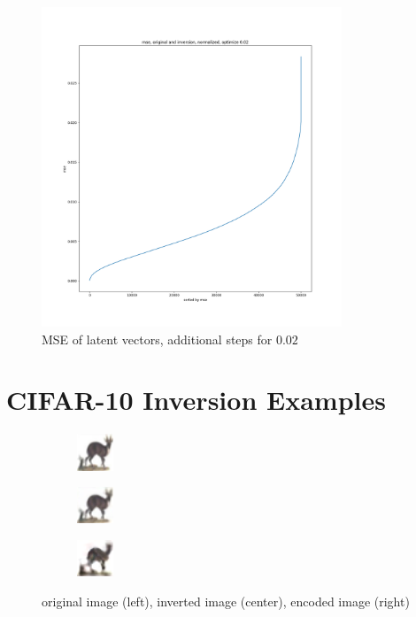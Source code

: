 \documentclass[nohyperref]{article}
\theoremstyle{plain}
\theoremstyle{definition}
\theoremstyle{remark}
\begin{document}
\begin{figure}[ht]
\begin{center}
    \includegraphics[width=0.8\textwidth]{plots/MSE0.02.png}
    \caption{MSE of latent vectors, additional steps for $0.02$}
    \label{MSE3}
\end{center}
\end{figure}

\clearpage
\section{CIFAR-10 Inversion Examples}
\begin{figure}[ht]
    \centering
    \begin{subfigure}{ }
        \includegraphics[width=0.12\textwidth]{inversion_images/original_04503_4.png}
    \end{subfigure}
    \begin{subfigure}{ }
        \includegraphics[width=0.12\textwidth]{inversion_images/inversion_04503_4.png}
    \end{subfigure}
    \begin{subfigure}{ }
        \includegraphics[width=0.12\textwidth]{inversion_images/encoder_04503_4.png}
    \end{subfigure}
    \caption{original image (left), inverted image (center), encoded image (right)}
    \label{inv1}
\end{figure}
\end{document}
